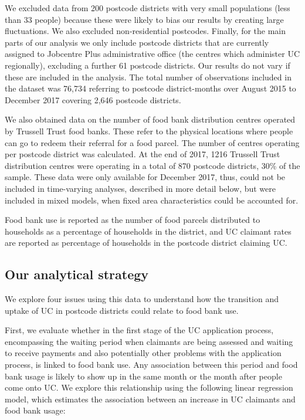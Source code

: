 \documentclass[12pt,article,oneside]{memoir}
\begin{document}
We excluded data from 200 postcode districts with very small populations (less than 33 people) because these were likely to bias our results by creating large fluctuations. We also excluded non-residential postcodes. Finally, for the main parts of our analysis we only include postcode districts that are currently assigned to Jobcentre Plus administrative office (the centres which administer UC regionally), excluding a further 61 postcode districts. Our results do not vary if these are included in the analysis. The total number of observations included in the dataset was 76,734 referring to postcode district-months over August 2015 to December 2017 covering 2,646 postcode districts. 

We also obtained data on the number of food bank distribution centres operated by Trussell Trust food banks. These refer to the physical locations where people can go to redeem their referral for a food parcel. The number of centres operating per postcode district was calculated. At the end of 2017, 1216 Trussell Trust distribution centres were operating in a total of 870 postcode districts, 30\% of the sample. These data were only available for December 2017, thus, could not be included in time-varying analyses, described in more detail below, but were included in mixed models, when fixed area characteristics could be accounted for.

Food bank use is reported as the number of food parcels distributed to households as a percentage of households in the district, and UC claimant rates are reported as percentage of households in the postcode district claiming UC. 


\subsection*{Our analytical strategy}

We explore four issues using this data to understand how the transition and uptake of UC in postcode districts could relate to food bank use.  

First, we evaluate whether in the first stage of the UC application process, encompassing the waiting period when claimants are being assessed and waiting to receive payments and also potentially other problems with the application process, is linked to food bank use. Any association between this period and food bank usage is likely to show up in the same month or the month after people come onto UC. We explore this relationship using the following linear regression model, which estimates the association between an increase in UC claimants and food bank usage: 
\end{document}
